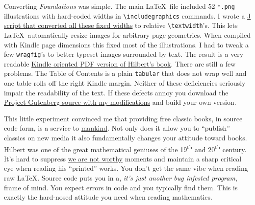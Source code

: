 Converting \emph{Foundations} was simple. The main \LaTeX\ file
included 52 \texttt{*.png} illustrations with hard-coded widths in
\verb|\includegraphics| commands. I wrote a
\href{http://www.box.net/shared/prbdlqpysa2zmugelzye}{J script that
converted all these fixed widths} to relative
\verb|\textwidth|'s. This lets \LaTeX\ automatically
resize images for arbitrary page geometries. When compiled with Kindle
page dimensions this fixed most of the illustrations. I had to tweak a
few \texttt{wragfig}'s to better typeset images surrounded by text. The result is
a very readable
\href{http://www.box.net/shared/7gzg1ssu5gddr953et6h}{Kindle oriented
PDF version of Hilbert's book}. There are still a few problems. The
Table of Contents is a plain \texttt{tabular} that does not wrap well and one
table rolls off the right Kindle margin. Neither of these deficiencies
seriously impair the readability of the text. If these defects annoy you
download the
\href{http://www.box.net/shared/p6zmknarsscnrci8vj8o}{Project Gutenberg
source with my modifications} and build your own version.

This little experiment convinced me that providing free classic books,
in source code form, is a service to
\href{http://www.articlesbase.com/writing-articles/is-mankind-sexist-1836076.html}{mankind}.
Not only does it allow you to ``publish'' classics on new media it also
fundamentally changes your attitude toward books. Hilbert was one of the
great mathematical geniuses of the 19\textsuperscript{th} and 20\textsuperscript{th} century. It's hard to
suppress \href{http://www.youtube.com/watch?v=-FucbvoFFy0}{we are not
worthy} moments and maintain a sharp critical eye when reading his
``printed'' works. You don't get the same vibe when reading raw
\LaTeX. Source code puts you in a, \emph{it's just another bug
infested program}, frame of mind. You expect errors in code and you
typically find them. This is exactly the hard-nosed attitude you need
when reading mathematics.




%